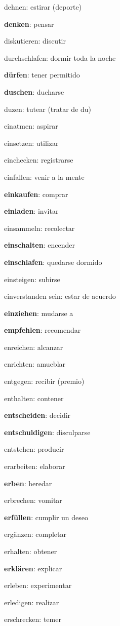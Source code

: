 \begin{multicols}{2}
\begin{myitemize}
\item dehnen: estirar (deporte)
\item \textbf{denken}: pensar
\item diskutieren: discutir
\item durchschlafen: dormir toda la noche
\item \textbf{dürfen}: tener permitido
\item \textbf{duschen}: ducharse
\item duzen: tutear (tratar de du)
\item einatmen: aspirar
\item einsetzen: utilizar
\item einchecken: registrarse
\item einfallen: venir a la mente
\item \textbf{einkaufen}: comprar
\item \textbf{einladen}: invitar
\item einsammeln: recolectar
\item \textbf{einschalten}: encender
\item \textbf{einschlafen}: quedarse dormido
\item einsteigen: subirse
\item einverstanden sein: estar de acuerdo
\item \textbf{einziehen}: mudarse a
\item \textbf{empfehlen}: recomendar
\item enreichen: alcanzar
\item enrichten: amueblar
\item entgegen: recibir (premio)
\item enthalten: contener
\item \textbf{entscheiden}: decidir
\item \textbf{entschuldigen}: disculparse
\item entstehen: producir
\item erarbeiten: elaborar
\item \textbf{erben}: heredar
\item erbrechen: vomitar
\item \textbf{erfüllen}: cumplir un deseo
\item ergänzen: completar
\item erhalten: obtener
\item \textbf{erklären}: explicar
\item erleben: experimentar
\item erledigen: realizar
\item erschrecken: temer

\end{myitemize}
\end{multicols}
